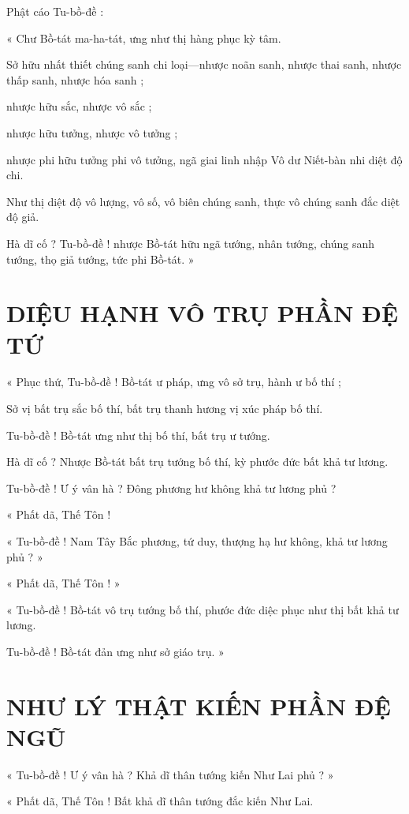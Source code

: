 	Phật cáo Tu-bồ-đề :
	
	« Chư Bồ-tát ma-ha-tát, ưng như thị hàng phục kỳ tâm. 
	
	Sở hữu nhất thiết chúng sanh chi loại—nhược noãn sanh, nhược thai sanh, nhược thấp sanh, nhược hóa sanh ; 
	
	nhược hữu sắc, nhược vô sắc ; 
	
	nhược hữu tưởng, nhược vô tưởng ; 
	
	nhược phi hữu tưởng phi vô tưởng, ngã giai linh nhập Vô dư Niết-bàn nhi diệt độ chi. 
	
	Như thị diệt độ vô lượng, vô số, vô biên chúng sanh, thực vô chúng sanh đắc diệt độ giả. 
	
	Hà dĩ cố ? Tu-bồ-đề ! nhược Bồ-tát hữu ngã tướng, nhân tướng, chúng sanh tướng, thọ giả tướng, tức phi Bồ-tát. »
	
	\section*{DIỆU HẠNH VÔ TRỤ PHẦN ĐỆ TỨ}
	
	« Phục thứ, Tu-bồ-đề ! Bồ-tát ư pháp, ưng vô sở trụ, hành ư bố thí ; 
	
	Sở vị bất trụ sắc bố thí, bất trụ thanh hương vị xúc pháp bố thí. 
	
	Tu-bồ-đề ! Bồ-tát ưng như thị bố thí, bất trụ ư tướng. 
	
	Hà dĩ cố ? Nhược Bồ-tát bất trụ tướng bố thí, kỳ phước đức bất khả tư lương. 
	
	Tu-bồ-đề ! Ư ý vân hà ? Đông phương hư không khả tư lương phủ ?
	
	« Phất dã, Thế Tôn !
	
	« Tu-bồ-đề ! Nam Tây Bắc phương, tứ duy, thượng hạ hư không, khả tư lương phủ ? »
	
	« Phất dã, Thế Tôn ! »
	
	« Tu-bồ-đề ! Bồ-tát vô trụ tướng bố thí, phước đức diệc phục như thị bất khả tư lương. 
	
	Tu-bồ-đề ! Bồ-tát đản ưng như sở giáo trụ. »
	
	\section*{NHƯ LÝ THẬT KIẾN PHẦN ĐỆ NGŨ}
	
	« Tu-bồ-đề ! Ư ý vân hà ? Khả dĩ thân tướng kiến Như Lai phủ ? »
	
	« Phất dã, Thế Tôn ! Bất khả dĩ thân tướng đắc kiến Như Lai. 
	
